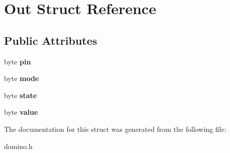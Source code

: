 \hypertarget{struct_out}{}\section{Out Struct Reference}
\label{struct_out}
\subsection*{Public Attributes}
\begin{DoxyCompactItemize}
\item 
\hypertarget{struct_out_a9666b03664d7426bc9cc2a81066d74d5}{}byte {\bfseries pin}\label{struct_out_a9666b03664d7426bc9cc2a81066d74d5}

\item 
\hypertarget{struct_out_abec1a8c187e0c5e8c98ea6c92b943ebd}{}byte {\bfseries mode}\label{struct_out_abec1a8c187e0c5e8c98ea6c92b943ebd}

\item 
\hypertarget{struct_out_a1d253adf6f4bf818b66fa2cd1612a9fa}{}byte {\bfseries state}\label{struct_out_a1d253adf6f4bf818b66fa2cd1612a9fa}

\item 
\hypertarget{struct_out_ad4ecf0aa27edbdccc17d3ffdf7f6b88d}{}byte {\bfseries value}\label{struct_out_ad4ecf0aa27edbdccc17d3ffdf7f6b88d}

\end{DoxyCompactItemize}


The documentation for this struct was generated from the following file\+:\begin{DoxyCompactItemize}
\item 
domino.\+h\end{DoxyCompactItemize}
